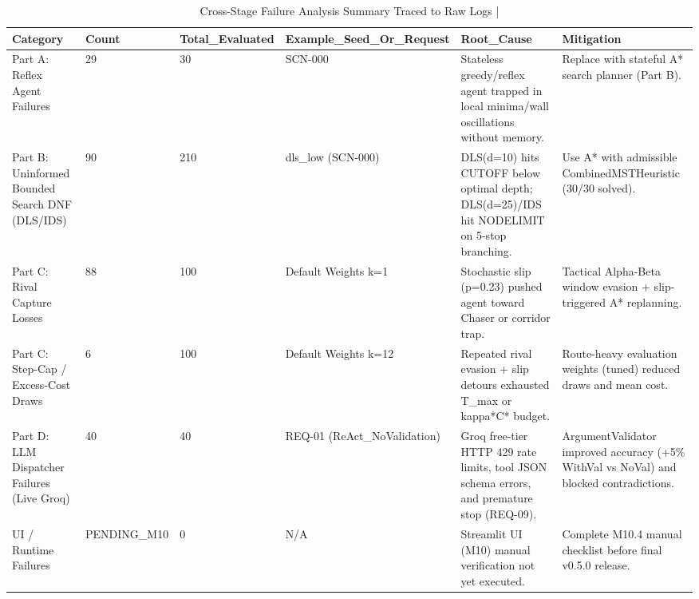 \begin{table}[htbp]
\centering
\caption{Cross-Stage Failure Analysis Summary Traced to Raw Logs | \stampline}
\label{tab:failure_analysis}
\begin{tabular}{llllll}
\toprule
Category & Count & Total\_Evaluated & Example\_Seed\_Or\_Request & Root\_Cause & Mitigation \\
\midrule
Part A: Reflex Agent Failures & 29 & 30 & SCN-000 & Stateless greedy/reflex agent trapped in local minima/wall oscillations without memory. & Replace with stateful A* search planner (Part B). \\
Part B: Uninformed Bounded Search DNF (DLS/IDS) & 90 & 210 & dls\_low (SCN-000) & DLS(d=10) hits CUTOFF below optimal depth; DLS(d=25)/IDS hit NODELIMIT on 5-stop branching. & Use A* with admissible CombinedMSTHeuristic (30/30 solved). \\
Part C: Rival Capture Losses & 88 & 100 & Default Weights k=1 & Stochastic slip (p=0.23) pushed agent toward Chaser or corridor trap. & Tactical Alpha-Beta window evasion + slip-triggered A* replanning. \\
Part C: Step-Cap / Excess-Cost Draws & 6 & 100 & Default Weights k=12 & Repeated rival evasion + slip detours exhausted T\_max or kappa*C* budget. & Route-heavy evaluation weights (tuned) reduced draws and mean cost. \\
Part D: LLM Dispatcher Failures (Live Groq) & 40 & 40 & REQ-01 (ReAct\_NoValidation) & Groq free-tier HTTP 429 rate limits, tool JSON schema errors, and premature stop (REQ-09). & ArgumentValidator improved accuracy (+5\% WithVal vs NoVal) and blocked contradictions. \\
UI / Runtime Failures & PENDING\_M10 & 0 & N/A & Streamlit UI (M10) manual verification not yet executed. & Complete M10.4 manual checklist before final v0.5.0 release. \\
\bottomrule
\end{tabular}

\end{table}

